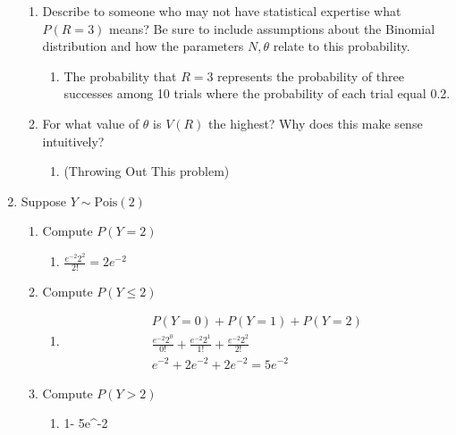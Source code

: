 \documentclass[krantz1,ChapterTOCs]{krantz}
\begin{document}
\begin{enumerate}
\begin{enumerate}
        \item Describe to someone who may not have statistical expertise what $P(R=3)$ means? Be sure to include assumptions about the Binomial distribution and how the parameters $N,\theta$ relate to this probability.
        \begin{enumerate}
            \item {\color{red}  The probability that $R=3$ represents the probability of three successes among 10 trials where the probability of each trial equal 0.2.  }
        \end{enumerate} 

        \item For what value of $\theta$ is $V(R)$ the highest? Why does this make sense intuitively?
        \begin{enumerate}
            \item {\color{red} (Throwing Out This problem)  }
        \end{enumerate} 

    \end{enumerate}
    \item Suppose $Y \sim \text{Pois}(2)$
    \begin{enumerate}
        \item Compute $P(Y=2)$
        \begin{enumerate}
            \item {\color{red} $ \frac{e^{-2} 2^{2}}{2!} = 2e^{-2}$  }
        \end{enumerate} 

        \item Compute $P(Y \leq 2)$
        \begin{enumerate}
            \item {\color{red}
            \begin{align}
                P(Y=0) + P(Y=1) + P(Y=2) \\ 
                \frac{e^{-2} 2^{0}}{0!} + \frac{e^{-2} 2^{1}}{1!} + \frac{e^{-2} 2^{2}}{2!} \\
                e^{-2} + 2e^{-2} + 2e^{-2} = 5e^{-2}
            \end{align}
            }
        \end{enumerate} 

        \item Compute $P(Y > 2)$
        \begin{enumerate}
            \item {\color{red} 1- 5e^{-2}}
        \end{enumerate} 


\end{enumerate}
\end{enumerate}
\end{document}
